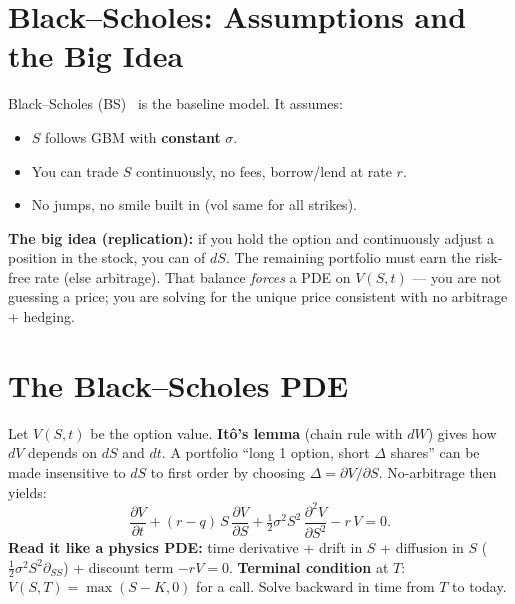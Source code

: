 \section{Black--Scholes: Assumptions and the Big Idea}
\label{sec:bs-assumptions}
Black--Scholes (BS)~\cite{wiki-black-scholes} is the baseline model. It assumes:
\begin{itemize}
    \item $S$ follows GBM with \textbf{constant} $\sigma$.
    \item You can trade $S$ continuously, no fees, borrow/lend at rate $r$.
    \item No jumps, no smile built in (vol same for all strikes).
\end{itemize}
\textbf{The big idea (replication):} if you hold the option and continuously adjust a 
position in the stock, you can  of $dS$. 
The remaining portfolio must earn the risk-free rate (else arbitrage). 
That balance \emph{forces} a PDE on $V(S,t)$ --- you are not guessing a price; 
you are solving for the unique price consistent with no arbitrage + hedging.

\section{The Black--Scholes PDE}
\label{sec:bs-pde}
Let $V(S,t)$ be the option value. \textbf{It\^o's lemma} (chain rule with $dW$) gives 
how $dV$ depends on $dS$ and $dt$. A portfolio ``long 1 option, short $\Delta$ shares'' 
can be made insensitive to $dS$ to first order by choosing $\Delta = \partial V/\partial S$. 
No-arbitrage then yields:
\begin{equation}
  \frac{\partial V}{\partial t}
  + (r - q)\,S\,\frac{\partial V}{\partial S}
  + \tfrac{1}{2}\sigma^2 S^2\,\frac{\partial^2 V}{\partial S^2}
  - r\,V = 0 .
  \label{eq:bs-pde}
\end{equation}
\textbf{Read it like a physics PDE:} time derivative + drift in $S$ + diffusion in $S$ 
($\tfrac{1}{2}\sigma^2 S^2 \partial_{SS}$) + discount term $-rV = 0$. 
\textbf{Terminal condition} at $T$: $V(S,T) = \max(S-K,0)$ for a call. 
Solve backward in time from $T$ to today.

